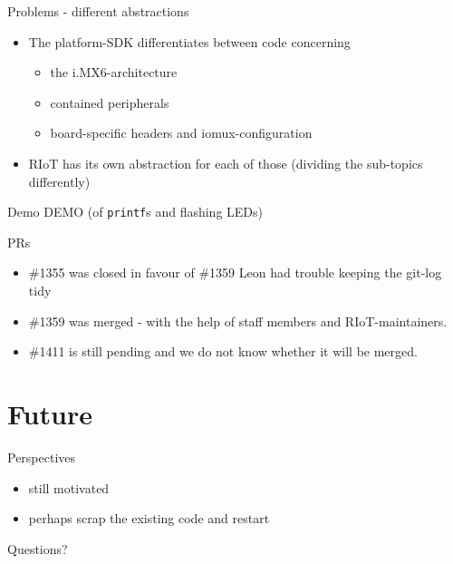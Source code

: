 \documentclass[9pt]{beamer}
\begin{document}
\begin{frame}{Problems - different abstractions}
 \begin{itemize}
 \item The platform-SDK differentiates between code concerning
 	\begin{itemize}
 	\item the i.MX6-architecture
 	\item contained peripherals
 	\item board-specific headers and iomux-configuration
 	\end{itemize}
 \item RIoT has its own abstraction for each of those (dividing the sub-topics differently)
 \end{itemize}
\end{frame}

\begin{frame}{Demo}
DEMO (of \texttt{printf}s and flashing LEDs)
\end{frame}

\begin{frame}{PRs}
 \begin{itemize}
 \item \#1355 was closed in favour of \#1359 \textcolor{light-gray}{Leon had trouble keeping the git-log tidy}
 \item \#1359 was merged - with the help of staff members and RIoT-maintainers.
 \item \#1411 is still pending and we do not know whether it will be merged.
 \end{itemize}
\end{frame}

\section{Future}

\begin{frame}{Perspectives}
 \begin{itemize}
 \item still motivated
 \item perhaps scrap the existing code and restart
 \end{itemize}
\end{frame}

\begin{frame}{Questions?}

\end{frame}
\end{document}
